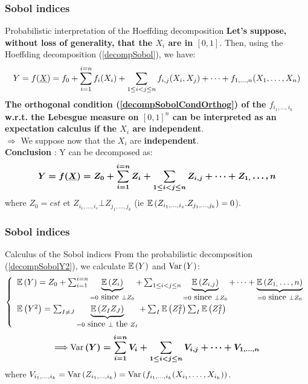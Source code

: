 \documentclass[8pt]{beamer}
\begin{document}
\begin{frame}
  \frametitle{Sobol indices}
\small
  \begin{block}{Probabilistic interpretation of the Hoeffding decomposition}
    \alert{\bf Let's suppose, without loss of generality, that the  $X_i$ are in $[0,1]$}. Then, using the Hoeffding decomposition (\ref{decompSobol}), we have:
    \begin{equation}
      \label{decompSobolY}
      Y = f({\underline{X}}) = f_0 + \sum_{i=1}^{i=n}f_i(X_i) + \sum_{1\leq i < j \leq n} f_{i,j} (X_i, X_j) + \dots + f_{1, \dots, n}(X_1, \dots, X_n)
    \end{equation}
    {\bf The orthogonal condition (\ref{decompSobolCondOrthog}) of the  $f_{i_1, \dots, i_k}$  w.r.t. the Lebesgue measure on $[0,1]^n$ can be interpreted as an expectation calculus if the $X_i$ are independent}.\\
    \alert{$\Longrightarrow$} We  suppose now that the $X_i$ are  \alert{\bf independent}.\\

    \alert{\bf Conclusion} :     Y can be decomposed as:
    \begin{equation}
      \label{decompSobolY2}
      \boldsymbol{ Y = f({\underline{X}}) = Z_0 + \sum_{i=1}^{i=n}Z_i + \sum_{1\leq i < j \leq n} Z_{i,j}  + \dots + Z_{1,} \dots, n}
    \end{equation}
    where $Z_0 = cst$ et $Z_{i_1, \dots, i_s} \bot  Z_{j_1, \dots, j_k}$ (ie $\mathbb{E}\left( Z_{i_1, \dots, i_s}.Z_{j_1, \dots, j_k} \right)=0$).
  \end{block}
\end{frame}


\begin{frame}
  \frametitle{Sobol indices}
\small
  \begin{block}{Calculus of the Sobol indices}
    \small{
      From the probabilistic decomposition (\ref{decompSobolY2}), we calculate $\mathbb{E}\left( Y \right)$ and $\mbox{Var}\left( Y \right)$:
      $$
      \left\{
        \begin{array}{l}
          \mathbb{E}\left( Y \right)  =  Z_0 + \sum_{i=1}^{i=n}\underbrace{\mathbb{E}\left( Z_i \right)}_{=0 \mbox{ since } \bot Z_0} + \sum_{1\leq i < j \leq n} \underbrace{\mathbb{E}\left( Z_{i,j} \right)}_{=0 \mbox{ since } \bot Z_0}  + \dots + \underbrace{\mathbb{E}\left( Z_{1,} \dots, n \right)}_{=0 \mbox{ since } \bot Z_0}  \\[2em]
          \mathbb{E}\left( Y^2 \right)   =   \sum_{I \neq J} \underbrace{\mathbb{E}\left( Z_IZ_J \right)}_{=0 \mbox{ since } \bot \mbox{ the } Z_I} + \sum_I \mathbb{E}\left( Z_I^2 \right)  \sum_I \mathbb{E}\left( Z_I^2 \right)
        \end{array}
      \right.
      $$
      \begin{eqnarray}
        \label{VarY}
        \Longrightarrow \boldsymbol{\mbox{Var}\left( Y \right) = \sum_{i=1}^{i=n} V_i + \sum_{1\leq i < j \leq n} V_{i,j}  + \dots + V_{1, \dots, n}}
      \end{eqnarray}
      where $V_{i_1, \dots, i_k} = \mbox{Var}\left( Z_{i_1, \dots, i_k} \right) = \mbox{Var}\left( f_{i_1, \dots, i_k}(X_{i_1}, \dots, X_{i_k}) \right)$.
    }
  \end{block}
\end{frame}
\end{document}
